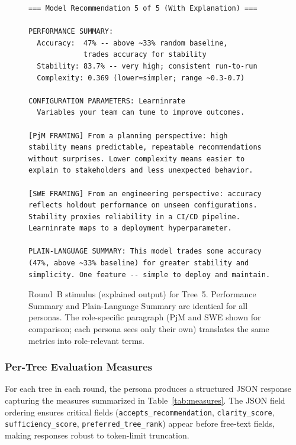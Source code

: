 \documentclass[sigconf,review]{acmart}
\begin{document}
\begin{figure}[ht]
\begin{mdframed}[backgroundcolor=boxgray, linecolor=boxborder,
                 linewidth=0.8pt, innerleftmargin=6pt,
                 innerrightmargin=6pt, innertopmargin=5pt,
                 innerbottommargin=5pt]
\begin{lstlisting}
=== Model Recommendation 5 of 5 (With Explanation) ===

PERFORMANCE SUMMARY:
  Accuracy:  47% -- above ~33% random baseline,
             trades accuracy for stability
  Stability: 83.7% -- very high; consistent run-to-run
  Complexity: 0.369 (lower=simpler; range ~0.3-0.7)

CONFIGURATION PARAMETERS: Learninrate
  Variables your team can tune to improve outcomes.

[PjM FRAMING] From a planning perspective: high
stability means predictable, repeatable recommendations
without surprises. Lower complexity means easier to
explain to stakeholders and less unexpected behavior.

[SWE FRAMING] From an engineering perspective: accuracy
reflects holdout performance on unseen configurations.
Stability proxies reliability in a CI/CD pipeline.
Learninrate maps to a deployment hyperparameter.

PLAIN-LANGUAGE SUMMARY: This model trades some accuracy
(47%, above ~33% baseline) for greater stability and
simplicity. One feature -- simple to deploy and maintain.
\end{lstlisting}
\end{mdframed}
\caption{Round~B stimulus (explained output) for Tree~5. Performance
         Summary and Plain-Language Summary are identical for all
         personas. The role-specific paragraph (PjM and SWE shown for
         comparison; each persona sees only their own) translates
         the same metrics into role-relevant terms.}
\label{fig:stimulus-explained}
\end{figure}

\subsubsection{Per-Tree Evaluation Measures}

For each tree in each round, the persona produces a structured JSON
response capturing the measures summarized in Table~\ref{tab:measures}.
The JSON field ordering ensures critical fields
(\texttt{accepts\_recommendation}, \texttt{clarity\_score},
\texttt{sufficiency\_score}, \texttt{preferred\_tree\_rank}) appear
before free-text fields, making responses robust to token-limit
truncation.
\end{document}
